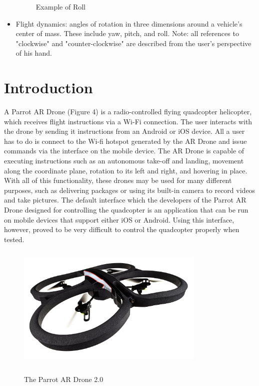 \documentclass[letterpaper,english, 12pt]{article}
\begin{document}
\begin{itemize}
\begin{figure}[H]
			\caption{Example of Roll}
		\end{figure}
		\item Flight dynamics: angles of rotation in three dimensions around a vehicle's center of mass. These include yaw, pitch, and roll. Note: all references to "clockwise" and "counter-clockwise" are described from the user's perspective of his hand.
\end{itemize}


\section*{Introduction}

A Parrot AR Drone (Figure 4) is a radio-controlled flying quadcopter helicopter, which receives flight instructions via a Wi-Fi connection. The user interacts with the drone by sending it instructions from an Android or iOS device. All a user has to do is connect to the Wi-fi hotspot generated by the AR Drone and issue commands via the interface on the mobile device. The AR Drone is capable of executing instructions such as an autonomous take-off and landing, movement along the coordinate plane, rotation to its left and right, and hovering in place. With all of this functionality, these drones may be used for many different purposes, such as delivering packages or using its built-in camera to record videos and take pictures. The default interface which the developers of the Parrot AR Drone designed for controlling the quadcopter is an application that can be run on mobile devices that support either iOS or Android. Using this interface, however, proved to be very difficult to control the quadcopter properly when tested.
        
\begin{figure}[H]
	\centering
	\includegraphics[height=6cm,width=90mm]{pics/drone.jpg} \\
	\caption{The Parrot AR Drone 2.0}
\end{figure}
	
\end{document}
